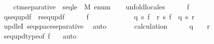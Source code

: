 \begin{isabellebody}
\ \ \isamarkupfalse%
\ ctm{\isacharunderscore}{\kern0pt}separative\ {\isachardoublequoteopen}{}{\isacharcircum}{\kern0pt}{\isacharless}{\kern0pt}{\isasymomega}{\isachardoublequoteclose}\ seqle\ {}\ M\ enum\isanewline
\ \ \isamarkupfalse%
\ {\isacharparenleft}{\kern0pt}unfold{\isacharunderscore}{\kern0pt}locales{\isacharparenright}{\kern0pt}\isanewline
\ \ \ \ \isamarkupfalse%
\ f\isanewline
\ \ \ \ \isamarkupfalse%
\ {\isacharquery}{\kern0pt}q{\isacharequal}{\kern0pt}{\isachardoublequoteopen}seq{\isacharunderscore}{\kern0pt}upd{\isacharparenleft}{\kern0pt}f{\isacharcomma}{\kern0pt}{}{\isacharparenright}{\kern0pt}{\isachardoublequoteclose}\ \ {\isacharquery}{\kern0pt}r{\isacharequal}{\kern0pt}{\isachardoublequoteopen}seq{\isacharunderscore}{\kern0pt}upd{\isacharparenleft}{\kern0pt}f{\isacharcomma}{\kern0pt}{}{\isacharparenright}{\kern0pt}{\isachardoublequoteclose}\isanewline
\ \ \ \ \isamarkupfalse%
\ {\isachardoublequoteopen}f\ {\isasymin}\ {}{\isacharcircum}{\kern0pt}{\isacharless}{\kern0pt}{\isasymomega}{\isachardoublequoteclose}\isanewline
\ \ \ \ \isamarkupfalse%
\isanewline
\ \ \ \ \isamarkupfalse%
\ {\isachardoublequoteopen}{\isacharquery}{\kern0pt}q\ {\isasympreceq}s\ f\ {\isasymand}\ {\isacharquery}{\kern0pt}r\ {\isasympreceq}s\ f\ {\isasymand}\ {\isacharquery}{\kern0pt}q\ {\isasymbottom}s\ {\isacharquery}{\kern0pt}r{\isachardoublequoteclose}\ \isanewline
\ \ \ \ \ \ \isamarkupfalse%
\ upd{\isacharunderscore}{\kern0pt}leI\ seqspace{\isacharunderscore}{\kern0pt}separative\ \isamarkupfalse%
\ auto\isanewline
\ \ \ \ \isamarkupfalse%
\ \isamarkupfalse%
\ calculation\isanewline
\ \ \ \ \isamarkupfalse%
\ {\isachardoublequoteopen}{\isacharquery}{\kern0pt}q\ {\isasymin}\ {}{\isacharcircum}{\kern0pt}{\isacharless}{\kern0pt}{\isasymomega}{\isachardoublequoteclose}\ \ {\isachardoublequoteopen}{\isacharquery}{\kern0pt}r\ {\isasymin}\ {}{\isacharcircum}{\kern0pt}{\isacharless}{\kern0pt}{\isasymomega}{\isachardoublequoteclose}\isanewline
\ \ \ \ \ \ \isamarkupfalse%
\ seq{\isacharunderscore}{\kern0pt}upd{\isacharunderscore}{\kern0pt}type{\isacharbrackleft}{\kern0pt}of\ f\ {}{\isacharbrackright}{\kern0pt}\ \isamarkupfalse%
\ auto\isanewline
\ \ \ \ \isamarkupfalse%
\isanewline
\ \ \ \ \isamarkupfalse%

\end{isabellebody}
